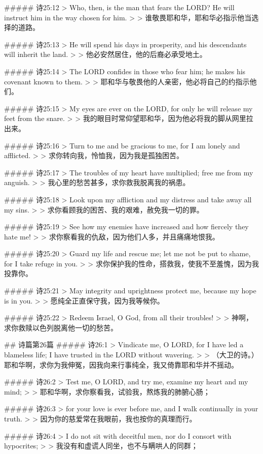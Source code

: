 ##### 诗25:12
> Who, then, is the man that fears the LORD? He will instruct him in the way chosen for him.
>
> 谁敬畏耶和华，耶和华必指示他当选择的道路。


##### 诗25:13
> He will spend his days in prosperity, and his descendants will inherit the land.
>
> 他必安然居住，他的后裔必承受地土。


##### 诗25:14
> The LORD confides in those who fear him; he makes his covenant known to them.
>
> 耶和华与敬畏他的人亲密，他必将自己的约指示他们。


##### 诗25:15
> My eyes are ever on the LORD, for only he will release my feet from the snare.
>
> 我的眼目时常仰望耶和华，因为他必将我的脚从网里拉出来。


##### 诗25:16
> Turn to me and be gracious to me, for I am lonely and afflicted.
>
> 求你转向我，怜恤我，因为我是孤独困苦。


##### 诗25:17
> The troubles of my heart have multiplied; free me from my anguish.
>
> 我心里的愁苦甚多，求你救我脱离我的祸患。


##### 诗25:18
> Look upon my affliction and my distress and take away all my sins.
>
> 求你看顾我的困苦、我的艰难，赦免我一切的罪。


##### 诗25:19
> See how my enemies have increased and how fiercely they hate me!
>
> 求你察看我的仇敌，因为他们人多，并且痛痛地恨我。


##### 诗25:20
> Guard my life and rescue me; let me not be put to shame, for I take refuge in you.
>
> 求你保护我的性命，搭救我，使我不至羞愧，因为我投靠你。


##### 诗25:21
> May integrity and uprightness protect me, because my hope is in you.
>
> 愿纯全正直保守我，因为我等候你。


##### 诗25:22
> Redeem Israel, O God, from all their troubles!
>
> 神啊，求你救赎以色列脱离他一切的愁苦。


## 诗篇第26篇
##### 诗26:1
> Vindicate me, O LORD, for I have led a blameless life; I have trusted in the LORD without wavering.
>
> （大卫的诗。）耶和华啊，求你为我伸冤，因我向来行事纯全，我又倚靠耶和华并不摇动。


##### 诗26:2
> Test me, O LORD, and try me, examine my heart and my mind;
>
> 耶和华啊，求你察看我，试验我，熬炼我的肺腑心肠；


##### 诗26:3
> for your love is ever before me, and I walk continually in your truth.
>
> 因为你的慈爱常在我眼前，我也按你的真理而行。


##### 诗26:4
> I do not sit with deceitful men, nor do I consort with hypocrites;
>
> 我没有和虚谎人同坐，也不与瞒哄人的同群；


